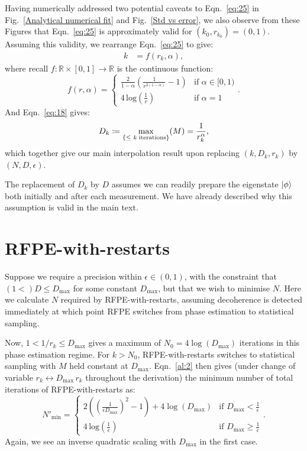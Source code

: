 \documentclass[twocolumn,
 reprint,
 amsmath,amssymb,
 aps,
 floatfix,
superscriptaddress
]{revtex4-1}
\begin{document}
Having numerically addressed two potential caveats to  Eqn.~\ref{eq:25} in Fig.~\ref{Analytical numerical fit} and Fig.~\ref{Std vs error}, we also observe from these Figures that Eqn.~\ref{eq:25} is approximately valid for $(k_{0},r_{k_{0}})=(0,1)$. Assuming this validity, we rearrange Eqn.~\ref{eq:25} to give:
\begin{align}\label{al:2}
k & =f(r_{k},\alpha),
\end{align}
where recall $f:\mathbb{R}\times[0,1]\rightarrow\mathbb{R}$ is the continuous function:
\begin{equation}\label{eq:27}
f(r,\alpha)=\begin{cases}
\frac{2}{1-\alpha}(\frac{1}{r^{2(1-\alpha)}}-1) & \text{if }\alpha\in[0,1)\\[5pt]
4\,\text{log}(\frac{1}{r}) & \text{if }\alpha=1
\end{cases}.
\end{equation}
 And Eqn.~\ref{eq:18} gives:
\begin{equation}\label{eq:28}
D_{k}\coloneqq\underset{\text{\{\ensuremath{\leq}\ {\it k }iterations\}}}{\text{max}}(M)=\frac{1}{r_{k}^{\alpha}},
\end{equation}
which together give our main interpolation result
upon replacing $(k,D_{k},r_{k})$ by $(N,D,\epsilon)$. 

The replacement of $D_{k}$ by $D$ assumes we can readily prepare the eigenstate $\Ket{\phi}$ both initially and after each measurement. We have already described why this assumption is valid in the main text. \FloatBarrier
\clearpage
\section{RFPE-with-restarts}\label{subsec:RFPE-with-restarts}

Suppose we require a precision within $\epsilon\in(0,1)$, with the constraint that $(1<)D\leq D_{\text{max}}$ for some constant $D_{\text{max}}$, but that we wish to minimise $N$. Here we calculate $N$ required by RFPE-with-restarts, assuming decoherence is detected immediately at which point RFPE switches from phase estimation to statistical sampling.

Now, $1<1/r_{k}\leq D_{\text{max}}$ gives a maximum of $N_{0}=4\log(D_{\text{max}})$
iterations in this phase estimation regime. For $k>N_{0}$, RFPE-with-restarts
switches to statistical sampling with $M$ held constant at $D_{\text{max}}$. Eqn.~\ref{al:2} then gives (under change of variable $r_{k}\leftrightarrow D_{\text{max}}\, r_{k}$
throughout the derivation) the minimum number of total iterations
of RFPE-with-restarts as: 
\begin{equation}\label{eq:30}
N'_{\text{min}}=\begin{cases}
2((\frac{1}{\epsilon D_{\text{max}}})^{2}-1)+4\log(D_{\text{max}}) & \text{if }D_{\text{max}}<\frac{1}{\epsilon}\\[5pt]
4\,\text{log}(\frac{1}{\epsilon}) & \text{if }D_{\text{max}}\geq\frac{1}{\epsilon}
\end{cases}.
\end{equation}
Again, we see an inverse quadratic scaling with $D_{\text{max}}$ in the first
case. 
\end{document}
